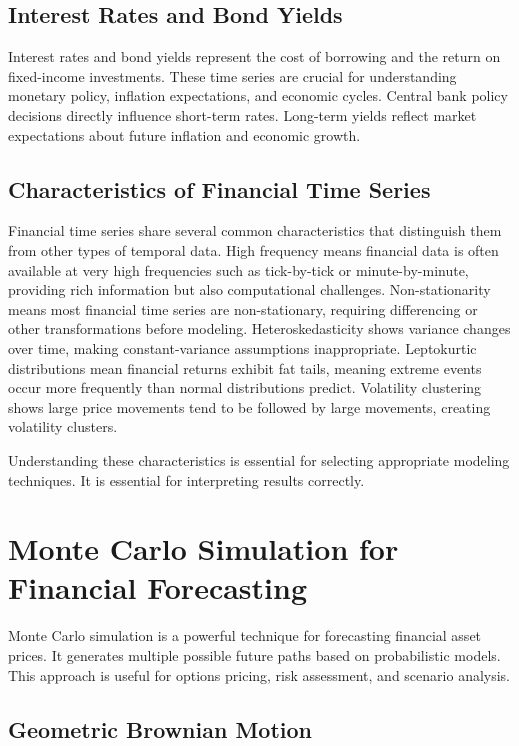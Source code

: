 \subsection{Interest Rates and Bond Yields}

Interest rates and bond yields represent the cost of borrowing and the return on fixed-income investments. These time series are crucial for understanding monetary policy, inflation expectations, and economic cycles. Central bank policy decisions directly influence short-term rates. Long-term yields reflect market expectations about future inflation and economic growth.

\subsection{Characteristics of Financial Time Series}

Financial time series share several common characteristics that distinguish them from other types of temporal data. High frequency means financial data is often available at very high frequencies such as tick-by-tick or minute-by-minute, providing rich information but also computational challenges. Non-stationarity means most financial time series are non-stationary, requiring differencing or other transformations before modeling. Heteroskedasticity shows variance changes over time, making constant-variance assumptions inappropriate. Leptokurtic distributions mean financial returns exhibit fat tails, meaning extreme events occur more frequently than normal distributions predict. Volatility clustering shows large price movements tend to be followed by large movements, creating volatility clusters.

Understanding these characteristics is essential for selecting appropriate modeling techniques. It is essential for interpreting results correctly.

\section{Monte Carlo Simulation for Financial Forecasting}

Monte Carlo simulation is a powerful technique for forecasting financial asset prices. It generates multiple possible future paths based on probabilistic models. This approach is useful for options pricing, risk assessment, and scenario analysis.

\subsection{Geometric Brownian Motion}

